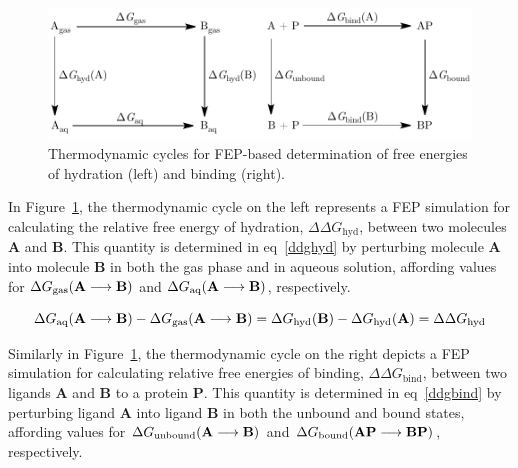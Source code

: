 \documentclass[12pt]{report}
\def\figlab{Figure}\def\figslab{\figlab s}
\def\equlab{eq}\def\equslab{Eqs.}
\newcommand*\eq[1]{\equlab~\ref{#1}}
\newcommand*\fig[1]{\figlab~\ref{#1}}
\begin{document}
\vspace*{0.2cm}
\begin{figure}[htbp]
\centering
\includegraphics[scale=0.99]{figures/pdf/thermocycle.pdf}
\caption{Thermodynamic cycles for FEP-based determination of free energies of hydration (left) and binding (right).}
\label{thermocycle}
\end{figure}
\vspace*{0.2cm}

In \fig{thermocycle}, the thermodynamic cycle on the left represents a FEP simulation for calculating the relative free energy of hydration, $\Delta\Delta G_{\textrm{hyd}}$, between two molecules \textbf{A} and \textbf{B}. This quantity is determined in \eq{ddghyd} by perturbing molecule \textbf{A} into molecule \textbf{B} in both the gas phase and in aqueous solution, affording values for $\Delta G_{\textrm{gas}}(\textrm{\textbf{A}} \longrightarrow \textrm{\textbf{B}})$ and $\Delta G_{\textrm{aq}}(\textrm{\textbf{A}} \longrightarrow \textrm{\textbf{B}})$, respectively. \vspace*{-0.4cm}

\vspace*{-0.4cm}
\begin{equation}
\label{ddghyd}
\Delta G_{\textrm{aq}}(\textrm{\textbf{A}} \longrightarrow \textrm{\textbf{B}}) - \Delta G_{\textrm{gas}}(\textrm{\textbf{A}} \longrightarrow \textrm{\textbf{B}}) = \Delta G_{\textrm{hyd}}(\textrm{\textbf{B}}) - \Delta G_{\textrm{hyd}}(\textrm{\textbf{A}}) = \Delta\Delta G_{\textrm{hyd}}
\end{equation}
\vspace*{-0.8cm}

Similarly in \fig{thermocycle}, the thermodynamic cycle on the right depicts a FEP simulation for calculating relative free energies of binding, $\Delta\Delta G_{\textrm{bind}}$, between two ligands \textbf{A} and \textbf{B} to a protein \textbf{P}. This quantity is determined in \eq{ddgbind} by perturbing ligand \textbf{A} into ligand \textbf{B} in both the unbound and bound states, affording values for $\Delta G_{\textrm{unbound}}(\textrm{\textbf{A}} \longrightarrow \textrm{\textbf{B}})$ and $\Delta G_{\textrm{bound}}(\textrm{\textbf{AP}} \longrightarrow \textrm{\textbf{BP}})$, respectively. 
\end{document}
